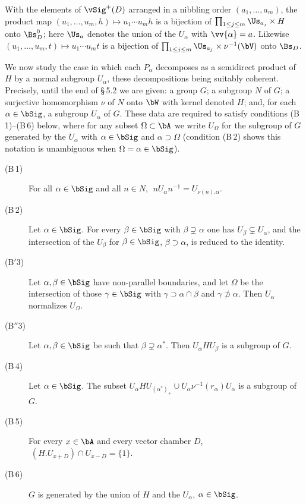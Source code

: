 \documentclass[12pt,a4paper,oneside,english]{smfart}
\makeatletter
\newcommand{\btanchor}[1]{\leavevmode\Hy@raisedlink{\hypertarget{bt:#1}{}}}
\theoremstyle{definition}
\theoremstyle{bt}
\makeatother
\begin{document}
 With the elements of $\vSig^{+}(D)$ arranged in a nibbling
order $(a_1,\dots,a_m)$, the product map
$(u_1,\dots,u_m,h)\mapsto u_1\cdots u_m h$ is a bijection of
$\prod_{1\le j\le m}\Us_{a_j}\times H$ onto $\Bs^{0}_{D}$; here $\Us_a$ denotes
the union of the $U_\alpha$ with $\vv{\alpha}=a$. Likewise
$(u_1,\dots,u_m,t)\mapsto u_1\cdots u_m t$ is a bijection of
$\prod_{1\le j\le m}\Us_{a_j}\times\nu^{-1}(\bV)$ onto $\Bs_{D}$.

\btanchor{5.2.30} We now study the case in which each $P_\alpha$ decomposes as a
semidirect product of $H$ by a normal subgroup $U_\alpha$, these decompositions
being suitably coherent. Precisely, until the end of \S\,5.2 we are given: a
group $G$; a subgroup $N$ of $G$; a surjective homomorphism $\nu$ of $N$ onto
$\bW$ with kernel denoted $H$; and, for each $\alpha\in\bSig$, a subgroup
$U_\alpha$ of $G$. These data are required to satisfy conditions
(B\,1)--(B\,6) below, where for any subset $\Omega\subset\bA$ we write
$U_\Omega$ for the subgroup of $G$ generated by the $U_\alpha$ with
$\alpha\in\bSig$ and $\alpha\supset\Omega$ (condition (B\,2) shows this notation
is unambiguous when $\Omega=\alpha\in\bSig$).

\begin{description}
\item[\rm (B\,1)] For all $\alpha\in\bSig$ and all $n\in N$,
  $\;nU_\alpha n^{-1}=U_{\nu(n).\alpha}$.
\item[\rm (B\,2)] Let $\alpha\in\bSig$. For every $\beta\in\bSig$ with
  $\beta\supsetneq\alpha$ one has $U_\beta\subsetneq U_\alpha$, and the
  intersection of the $U_\beta$ for $\beta\in\bSig$, $\beta\supset\alpha$, is
  reduced to the identity.
\item[\rm (B$'$3)] Let $\alpha,\beta\in\bSig$ have non-parallel boundaries, and
  let $\Omega$ be the intersection of those $\gamma\in\bSig$ with
  $\gamma\supset\alpha\cap\beta$ and $\gamma\not\supset\alpha$. Then $U_\alpha$
  normalizes $U_\Omega$.
\item[\rm (B$''$3)] Let $\alpha,\beta\in\bSig$ be such that
  $\beta\supsetneq\alpha^{*}$. Then $U_\alpha H U_\beta$ is a subgroup of $G$.
\item[\rm (B\,4)] Let $\alpha\in\bSig$. The subset
  $U_\alpha H U_{(\alpha^{*})_{+}}\cup U_\alpha\nu^{-1}(r_\alpha)U_\alpha$
  is a subgroup of $G$.
\item[\rm (B\,5)] For every $x\in\bA$ and every vector chamber $D$,
  $\;(H.U_{x+D})\cap U_{x-D}=\{1\}$.
\item[\rm (B\,6)] $G$ is generated by the union of $H$ and the $U_\alpha$,
  $\alpha\in\bSig$.
\end{description}
\end{document}
